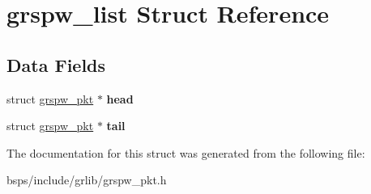 \hypertarget{structgrspw__list}{}\section{grspw\+\_\+list Struct Reference}
\label{structgrspw__list}
\subsection*{Data Fields}
\begin{DoxyCompactItemize}
\item 
\mbox{\label{structgrspw__list_aadee22ebb5d15e6f5b0f4eaf190f442b}} 
struct \mbox{\hyperlink{structgrspw__pkt}{grspw\+\_\+pkt}} $\ast$ {\bfseries head}
\item 
\mbox{\label{structgrspw__list_ad6afe2e30a3a9c620891da6062963482}} 
struct \mbox{\hyperlink{structgrspw__pkt}{grspw\+\_\+pkt}} $\ast$ {\bfseries tail}
\end{DoxyCompactItemize}


The documentation for this struct was generated from the following file\+:\begin{DoxyCompactItemize}
\item 
bsps/include/grlib/grspw\+\_\+pkt.\+h\end{DoxyCompactItemize}
